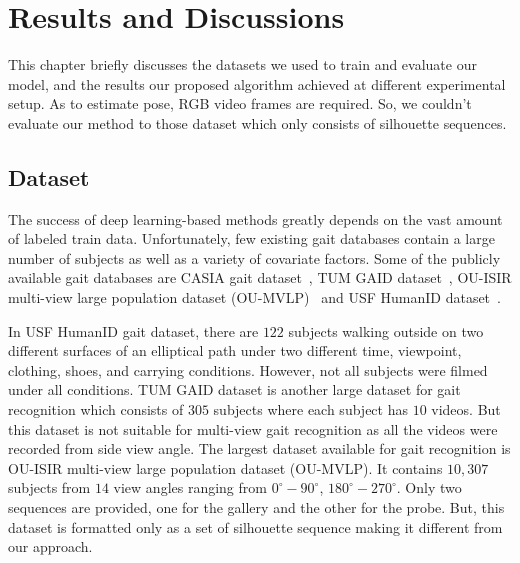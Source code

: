 \chapter{Results and Discussions}\label{ch:result_discussion}
This chapter briefly discusses the datasets we used to train and evaluate our model, and the results our proposed algorithm achieved at different experimental setup. As to estimate pose, RGB video frames are required. So, we couldn't evaluate our method to those dataset which only consists of silhouette sequences.


\section{Dataset}
The success of deep learning-based methods greatly depends on the vast amount of labeled train data. Unfortunately, few existing gait databases contain a large number of subjects as well as a variety of covariate factors. Some of the publicly available gait databases are CASIA gait dataset~\cite{Yu_06}, TUM GAID dataset~\cite{Hofmann_14}, OU-ISIR multi-view large population dataset (OU-MVLP)~\cite{Noriko_18} and USF HumanID dataset~\cite{Sarkar_05}. 

In USF HumanID gait dataset, there are $ 122 $ subjects walking outside on two different surfaces of an elliptical path under two different time, viewpoint, clothing, shoes, and carrying conditions. However, not all subjects were filmed under all conditions. TUM GAID dataset is another large dataset for gait recognition which consists of $ 305 $ subjects where each subject has $ 10 $ videos. But this dataset is not suitable for multi-view gait recognition as all the videos were recorded from side view angle. The largest dataset available for gait recognition is OU-ISIR multi-view large population dataset (OU-MVLP). It contains $ 10,307 $ subjects from $ 14 $ view angles ranging from ${{0}^{\circ}-{90}^{\circ}}$, ${{180}^{\circ}-{270}^{\circ}}$. Only two sequences are provided, one for the gallery and the other for the probe. But, this dataset is formatted only as a set of silhouette sequence making it different from our approach.

